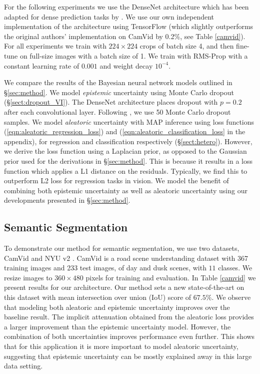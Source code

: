 \documentclass{article}
\begin{document}
For the following experiments we use the DenseNet architecture \cite{huang2016densely} which has been adapted for dense prediction tasks by \cite{jegou2016one}. We use our own independent implementation of the architecture using TensorFlow \cite{abadi2016tensorflow} (which slightly outperforms the original authors' implementation on CamVid by 0.2\%, see Table \ref{camvid}). For all experiments we train with $224\times224$ crops of batch size 4, and then fine-tune on full-size images with a batch size of 1. We train with RMS-Prop with a constant learning rate of $0.001$ and weight decay $10^{-4}$.



We compare the results of the Bayesian neural network models outlined in \S\ref{sec:method}. We model \textit{epistemic} uncertainty using Monte Carlo dropout (\S\ref{sect:dropout_VI}). The DenseNet architecture places dropout with $p=0.2$ after each convolutional layer. Following \cite{kendall2015bayesian}, we use 50 Monte Carlo dropout samples. We model \textit{aleatoric} uncertainty with MAP inference using loss functions (\ref{eqn:aleatoric_regression_loss}) and (\ref{eqn:aleatoric_classification_loss} in the appendix), for regression and classification respectively (\S\ref{sect:hetero}).
However, we derive the loss function using a Laplacian prior, as opposed to the Gaussian prior used for the derivations in \S\ref{sec:method}. This is because it results in a loss function which applies a L1 distance on the residuals. Typically, we find this to outperform L2 loss for regression tasks in vision.
We model the benefit of combining both epistemic uncertainty as well as aleatoric uncertainty using our developments presented in \S\ref{sec:method}. 

\subsection{Semantic Segmentation}

To demonstrate our method for semantic segmentation, we use two datasets, CamVid \cite{brostow2009semantic} and NYU v2 \cite{silberman2012indoor}. CamVid is a road scene understanding dataset with 367 training images and 233 test images, of day and dusk scenes, with $11$ classes. We resize images to $360\times480$ pixels for training and evaluation. In Table \ref{camvid} we present results for our architecture. Our method sets a new state-of-the-art on this dataset with mean intersection over union (IoU) score of $67.5\%$. We observe that modeling both aleatoric and epistemic uncertainty improves over the baseline result.  The implicit attenuation obtained from the aleatoric loss provides a larger improvement than the epistemic uncertainty model. However, the combination of both uncertainties improves performance even further. This shows that for this application it is more important to model aleatoric uncertainty, suggesting that epistemic uncertainty can be mostly explained away in this large data setting.
\end{document}
